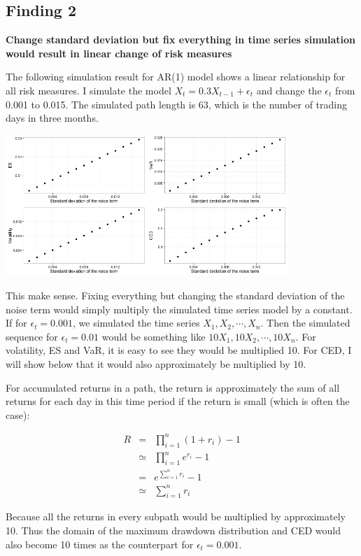 \documentclass[11pt]{article}
\begin{document}
\subsection{Finding 2}

\textbf{Change standard deviation but fix everything in time series simulation would result in linear change of risk measures}

The following simulation result for AR(1) model shows a linear relationship for all risk measures. I simulate the model $X_t = 0.3X_{t-1} + \epsilon_t$ and change the $\epsilon_t$ from 0.001 to 0.015. The simulated path length is 63, which is the number of trading days in three months. 

\includegraphics[width = 0.8\textwidth]{../figures/simulation/AR1_risk_measures_change_sd}

This make sense. Fixing everything but changing the standard deviation of the noise term would simply multiply the simulated time series model by a constant. If for $\epsilon_t = 0.001$, we simulated the time series $X_1, X_2, \cdots, X_n$. Then the simulated sequence for $\epsilon_t = 0.01$ would be something like $10X_1, 10X_2, \cdots, 10X_n$. For volatility, ES and VaR, it is easy to see they would be multiplied 10. For CED, I will show below that it would also approximately be multiplied by 10. 

For accumulated returns in a path, the return is approximately the sum of all returns for each day in this time period if the return is small (which is often the case):

\begin{eqnarray}
R & = & \prod_{i=1}^n (1+r_i) - 1\\
& \simeq & \prod_{i=1}^n e^{r_i} - 1 \\
& = & e^{\sum_{i=1}^n r_i} - 1 \\
& \simeq & \sum_{i=1}^n r_i
\end{eqnarray}

Because all the returns in every subpath would be multiplied by approximately 10. Thus the domain of the maximum drawdown distribution and CED would also become 10 times as the counterpart for $\epsilon_t = 0.001$.
\end{document}
